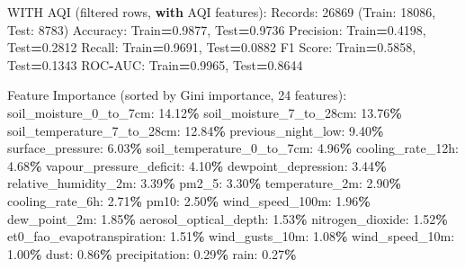 \documentclass[
  letterpaper,
  DIV=11,
  numbers=noendperiod]{scrartcl}
\newenvironment{Shaded}{\begin{snugshade}}{\end{snugshade}}
\newcommand{\BuiltInTok}[1]{#1}
\newcommand{\ControlFlowTok}[1]{\textcolor[rgb]{0.13,0.29,0.53}{\textbf{#1}}}
\newcommand{\DecValTok}[1]{\textcolor[rgb]{0.00,0.00,0.81}{#1}}
\newcommand{\FloatTok}[1]{\textcolor[rgb]{0.00,0.00,0.81}{#1}}
\newcommand{\NormalTok}[1]{#1}
\newcommand{\OperatorTok}[1]{\textcolor[rgb]{0.81,0.36,0.00}{\textbf{#1}}}
\begin{document}
\begin{Shaded}
\begin{Highlighting}[]
\NormalTok{WITH AQI (filtered rows, }\ControlFlowTok{with}\NormalTok{ AQI features):}
\NormalTok{  Records: }\DecValTok{26869}\NormalTok{ (Train: }\DecValTok{18086}\NormalTok{, Test: }\DecValTok{8783}\NormalTok{)}
\NormalTok{  Accuracy: Train}\OperatorTok{=}\FloatTok{0.9877}\NormalTok{, Test}\OperatorTok{=}\FloatTok{0.9736}
\NormalTok{  Precision: Train}\OperatorTok{=}\FloatTok{0.4198}\NormalTok{, Test}\OperatorTok{=}\FloatTok{0.2812}
\NormalTok{  Recall: Train}\OperatorTok{=}\FloatTok{0.9691}\NormalTok{, Test}\OperatorTok{=}\FloatTok{0.0882}
\NormalTok{  F1 Score: Train}\OperatorTok{=}\FloatTok{0.5858}\NormalTok{, Test}\OperatorTok{=}\FloatTok{0.1343}
\NormalTok{  ROC}\OperatorTok{{-}}\NormalTok{AUC: Train}\OperatorTok{=}\FloatTok{0.9965}\NormalTok{, Test}\OperatorTok{=}\FloatTok{0.8644}

\NormalTok{  Feature Importance (}\BuiltInTok{sorted}\NormalTok{ by Gini importance, }\DecValTok{24}\NormalTok{ features):}
\NormalTok{    soil\_moisture\_0\_to\_7cm: }\FloatTok{14.12}\OperatorTok{\%}
\NormalTok{    soil\_moisture\_7\_to\_28cm: }\FloatTok{13.76}\OperatorTok{\%}
\NormalTok{    soil\_temperature\_7\_to\_28cm: }\FloatTok{12.84}\OperatorTok{\%}
\NormalTok{    previous\_night\_low: }\FloatTok{9.40}\OperatorTok{\%}
\NormalTok{    surface\_pressure: }\FloatTok{6.03}\OperatorTok{\%}
\NormalTok{    soil\_temperature\_0\_to\_7cm: }\FloatTok{4.96}\OperatorTok{\%}
\NormalTok{    cooling\_rate\_12h: }\FloatTok{4.68}\OperatorTok{\%}
\NormalTok{    vapour\_pressure\_deficit: }\FloatTok{4.10}\OperatorTok{\%}
\NormalTok{    dewpoint\_depression: }\FloatTok{3.44}\OperatorTok{\%}
\NormalTok{    relative\_humidity\_2m: }\FloatTok{3.39}\OperatorTok{\%}
\NormalTok{    pm2\_5: }\FloatTok{3.30}\OperatorTok{\%}
\NormalTok{    temperature\_2m: }\FloatTok{2.90}\OperatorTok{\%}
\NormalTok{    cooling\_rate\_6h: }\FloatTok{2.71}\OperatorTok{\%}
\NormalTok{    pm10: }\FloatTok{2.50}\OperatorTok{\%}
\NormalTok{    wind\_speed\_100m: }\FloatTok{1.96}\OperatorTok{\%}
\NormalTok{    dew\_point\_2m: }\FloatTok{1.85}\OperatorTok{\%}
\NormalTok{    aerosol\_optical\_depth: }\FloatTok{1.53}\OperatorTok{\%}
\NormalTok{    nitrogen\_dioxide: }\FloatTok{1.52}\OperatorTok{\%}
\NormalTok{    et0\_fao\_evapotranspiration: }\FloatTok{1.51}\OperatorTok{\%}
\NormalTok{    wind\_gusts\_10m: }\FloatTok{1.08}\OperatorTok{\%}
\NormalTok{    wind\_speed\_10m: }\FloatTok{1.00}\OperatorTok{\%}
\NormalTok{    dust: }\FloatTok{0.86}\OperatorTok{\%}
\NormalTok{    precipitation: }\FloatTok{0.29}\OperatorTok{\%}
\NormalTok{    rain: }\FloatTok{0.27}\OperatorTok{\%}


\end{Highlighting}
\end{Shaded}
\end{document}
